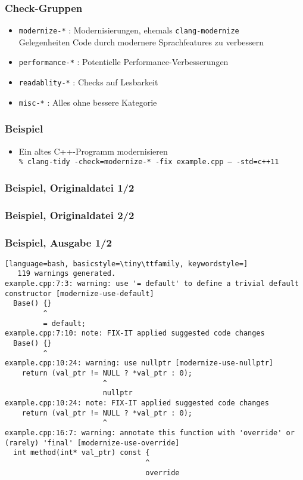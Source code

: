 \documentclass[aspectratio=169]{beamer}
\begin{document}
\begin{frame}
  \frametitle{Check-Gruppen}
  \begin{itemize}
  \item \texttt{modernize-*} : Modernisierungen, ehemals \texttt{clang-modernize}\\
    Gelegenheiten Code durch modernere Sprachfeatures zu verbessern
  \item \texttt{performance-*} : Potentielle Performance-Verbesserungen
  \item \texttt{readablity-*} : Checks auf Lesbarkeit
  \item \texttt{misc-*} : Alles ohne bessere Kategorie
  \end{itemize}
\end{frame}
\begin{frame}[fragile]
  \frametitle{Beispiel}
  \begin{itemize}
  \item Ein altes C++-Programm modernisieren\\
    \texttt{\% clang-tidy -check=modernize-* -fix example.cpp -- -std=c++11}
  \end{itemize}
\end{frame}
\begin{frame}[fragile]
  \frametitle{Beispiel, Originaldatei 1/2}

\end{frame}
\begin{frame}[fragile]
  \frametitle{Beispiel, Originaldatei 2/2}
  
\end{frame}
\begin{frame}[fragile]
  \frametitle{Beispiel, Ausgabe 1/2}
  \begin{lstlisting}[language=bash, basicstyle=\tiny\ttfamily, keywordstyle=]
   119 warnings generated.
example.cpp:7:3: warning: use '= default' to define a trivial default constructor [modernize-use-default]
  Base() {}
         ^
         = default;
example.cpp:7:10: note: FIX-IT applied suggested code changes
  Base() {}
         ^
example.cpp:10:24: warning: use nullptr [modernize-use-nullptr]
    return (val_ptr != NULL ? *val_ptr : 0);
                       ^
                       nullptr
example.cpp:10:24: note: FIX-IT applied suggested code changes
    return (val_ptr != NULL ? *val_ptr : 0);
                       ^
example.cpp:16:7: warning: annotate this function with 'override' or (rarely) 'final' [modernize-use-override]
  int method(int* val_ptr) const {
                                 ^
                                 override
\end{lstlisting}
\end{frame}
\end{document}
